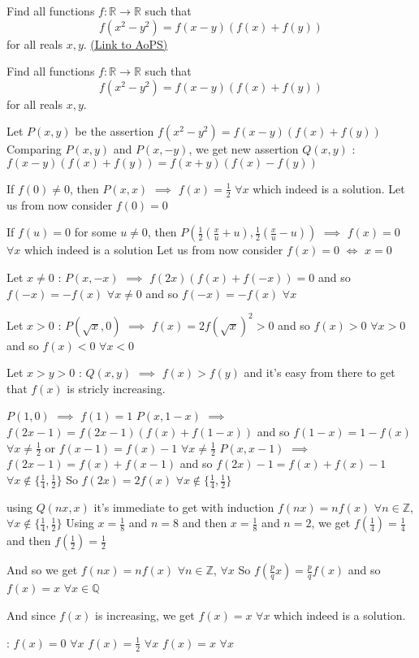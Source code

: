 \begin{problem}
	Find all functions $f:\mathbb{R}\rightarrow\mathbb{R}$ such that
\[f(x^2-y^2)=f(x-y)(f(x)+f(y))\]
for all reals $x,y$.
	\flushright \href{https://artofproblemsolving.com/community/c6h451763}{(Link to AoPS)}
\end{problem}



\begin{solution}
	\begin{tcolorbox}Find all functions $f:\mathbb{R}\rightarrow\mathbb{R}$ such that
\[f(x^2-y^2)=f(x-y)(f(x)+f(y))\]
for all reals $x,y$.\end{tcolorbox}
Let $P(x,y)$ be the assertion $f(x^2-y^2)=f(x-y)(f(x)+f(y))$
Comparing $P(x,y)$ and $P(x,-y)$, we get new assertion $Q(x,y)$ : $f(x-y)(f(x)+f(y))=f(x+y)(f(x)-f(y))$

If $f(0)\ne 0$, then $P(x,x)$ $\implies$ $f(x)=\frac 12$ $\forall x$ which indeed is a solution.
Let us from now consider $f(0)=0$

If $f(u)=0$ for some $u\ne 0$, then $P(\frac12(\frac xu+u),\frac12(\frac xu-u))$ $\implies$ $f(x)=0$ $\forall x$ which indeed is a solution
Let us from now consider $f(x)=0$ $\iff$ $x=0$

Let $x\ne 0$ : $P(x,-x)$ $\implies$ $f(2x)(f(x)+f(-x))=0$ and so $f(-x)=-f(x)$ $\forall x\ne 0$ and so $f(-x)=-f(x)$ $\forall x$

Let $x>0$ : $P(\sqrt x,0)$ $\implies$ $f(x)=2f(\sqrt x)^2>0$ and so $f(x)>0$ $\forall x>0$ and so $f(x)<0$ $\forall x<0$

Let $x>y>0$ : $Q(x,y)$ $\implies$ $f(x)>f(y)$ and it's easy from there to get that $f(x)$ is stricly increasing.

$P(1,0)$ $\implies$ $f(1)=1$
$P(x,1-x)$ $\implies$ $f(2x-1)=f(2x-1)(f(x)+f(1-x))$ and so $f(1-x)=1-f(x)$ $\forall x\ne \frac 12$ or $f(x-1)=f(x)-1$ $\forall x\ne \frac 12$
$P(x,x-1)$ $\implies$ $f(2x-1)=f(x)+f(x-1)$ and so $f(2x)-1=f(x)+f(x)-1$ $\forall x\notin\{\frac 14,\frac 12\}$
So $f(2x)=2f(x)$ $\forall x\notin\{\frac 14,\frac 12\}$

using $Q(nx,x)$ it's immediate to get with induction $f(nx)=nf(x)$ $\forall n\in\mathbb Z$, $\forall x\notin\{\frac 14,\frac 12\}$
Using $x=\frac 18$ and $n=8$ and then $x=\frac 18$ and $n=2$, we get $f(\frac 14)=\frac 14$ and then $f(\frac 12)=\frac 12$

And so we get $f(nx)=nf(x)$ $\forall n\in\mathbb Z$, $\forall x$
So $f(\frac pqx)=\frac pqf(x)$ and so $f(x)=x$ $\forall x\in\mathbb Q$

And since $f(x)$ is increasing, we get $f(x)=x$ $ \forall x$ which indeed is a solution.

 :
$f(x)=0$ $\forall x$
$f(x)=\frac 12$ $\forall x$
$f(x)=x$ $\forall x$
\end{solution}



